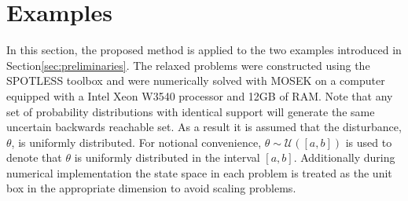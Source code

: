 \section{Examples}
\label{sec:examples}
In this section, the proposed method is applied to the two examples introduced in Section\ref{sec:preliminaries}.
The relaxed problems were constructed using the SPOTLESS toolbox \cite{spotless} and were numerically solved with MOSEK on a computer equipped with a Intel Xeon W3540 processor and 12GB of RAM.
Note that any set of probability distributions with identical support will generate the same uncertain backwards reachable set.
As a result it is assumed that the disturbance, $\theta$, is uniformly distributed.
For notional convenience, $\theta\sim\mathcal U([a,b])$ is used to denote that $\theta$ is uniformly distributed in the interval $[a,b]$.
Additionally during numerical implementation the state space in each problem is treated as the unit box in the appropriate dimension to avoid scaling problems.

